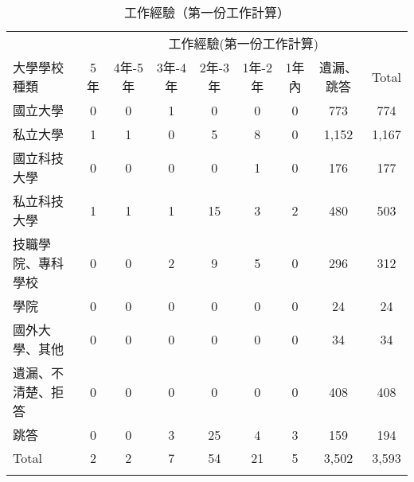 \documentclass[12pt, a4paper]{article}
\begin{document}
\begin{table}[H]
\centering
\renewcommand{\arraystretch}{1.3} %
\extrarowheight=4pt
\caption{工作經驗（第一份工作計算）}
\begin{adjustbox}{width=\textwidth}
\begin{tabular}{l*{8}{c}}
\toprule
& \multicolumn{8}{c}{工作經驗(第一份工作計算)} \\
\cmidrule(lr){2-9}
\multirow{2}{*}{大學學校種類} & \multirow{2}{*}{5年} & \multirow{2}{*}{4年-5年} & \multirow{2}{*}{3年-4年} & \multirow{2}{*}{2年-3年} & \multirow{2}{*}{1年-2年} & \multirow{2}{*}{1年內} & \multirow{2}{*}{遺漏、跳答} & \multirow{2}{*}{Total} \\
& & & & & & &、不清楚、跳答 & \\
\midrule
國立大學 & 0 & 0 & 1 & 0 & 0 & 0 & 773 & 774 \\
私立大學 & 1 & 1 & 0 & 5 & 8 & 0 & 1,152 & 1,167 \\
國立科技大學 & 0 & 0 & 0 & 0 & 1 & 0 & 176 & 177 \\
私立科技大學 & 1 & 1 & 1 & 15 & 3 & 2 & 480 & 503 \\
技職學院、專科學校 & 0 & 0 & 2 & 9 & 5 & 0 & 296 & 312 \\
學院 & 0 & 0 & 0 & 0 & 0 & 0 & 24 & 24 \\
國外大學、其他 & 0 & 0 & 0 & 0 & 0 & 0 & 34 & 34 \\
遺漏、不清楚、拒答 & 0 & 0 & 0 & 0 & 0 & 0 & 408 & 408 \\
跳答 & 0 & 0 & 3 & 25 & 4 & 3 & 159 & 194 \\
Total & 2 & 2 & 7 & 54 & 21 & 5 & 3,502 & 3,593 \\
\bottomrule
\label{tab:exper_first}
\end{tabular}
\end{adjustbox}
\end{table}


\end{document}
